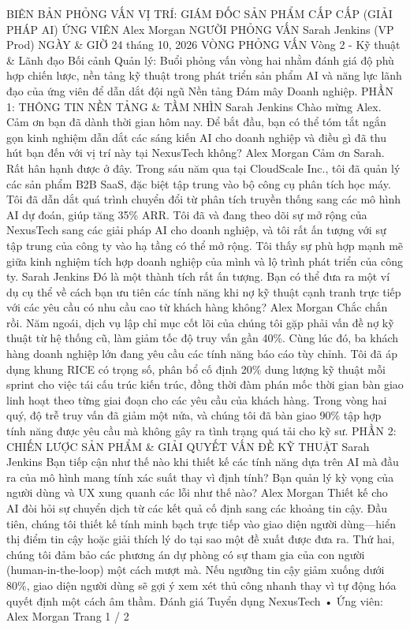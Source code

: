 \documentclass[12pt]{article}
\begin{document}
BIÊN BẢN PHỎNG VẤN
VỊ TRÍ: GIÁM ĐỐC SẢN PHẨM CẤP CẤP (GIẢI PHÁP AI)
ỨNG VIÊN
Alex Morgan
NGƯỜI PHỎNG VẤN
Sarah Jenkins (VP Prod)
NGÀY \& GIỜ
24 tháng 10, 2026
VÒNG PHỎNG VẤN
Vòng 2 - Kỹ thuật \&
Lãnh đạo
Bối cảnh Quản lý: Buổi phỏng vấn vòng hai nhằm đánh giá độ phù hợp chiến lược, nền tảng kỹ thuật trong phát triển sản phẩm AI và năng lực lãnh đạo của ứng viên để dẫn dắt đội ngũ Nền tảng Đám mây Doanh nghiệp.
PHẦN 1: THÔNG TIN NỀN TẢNG \& TẦM NHÌN
Sarah Jenkins
Chào mừng Alex. Cảm ơn bạn đã dành thời gian hôm nay. Để bắt đầu, bạn có thể tóm tắt ngắn gọn kinh nghiệm dẫn dắt các sáng kiến AI cho doanh nghiệp và điều gì đã thu hút bạn đến với vị trí này tại NexusTech không?
Alex Morgan
Cảm ơn Sarah. Rất hân hạnh được ở đây. Trong sáu năm qua tại CloudScale Inc., tôi đã quản lý các sản phẩm B2B SaaS, đặc biệt tập trung vào bộ công cụ phân tích học máy. Tôi đã dẫn dắt quá trình chuyển đổi từ phân tích truyền thống sang các mô hình AI dự đoán, giúp tăng 35\% ARR. Tôi đã và đang theo dõi sự mở rộng của NexusTech sang các giải pháp AI cho doanh nghiệp, và tôi rất ấn tượng với sự tập trung của công ty vào hạ tầng có thể mở rộng. Tôi thấy sự phù hợp mạnh mẽ giữa kinh nghiệm tích hợp doanh nghiệp của mình và lộ trình phát triển của công ty.
Sarah Jenkins
Đó là một thành tích rất ấn tượng. Bạn có thể đưa ra một ví dụ cụ thể về cách bạn ưu tiên các tính năng khi nợ kỹ thuật cạnh tranh trực tiếp với các yêu cầu có nhu cầu cao từ khách hàng không?
Alex Morgan
Chắc chắn rồi. Năm ngoái, dịch vụ lập chỉ mục cốt lõi của chúng tôi gặp phải vấn đề nợ kỹ thuật từ hệ thống cũ, làm giảm tốc độ truy vấn gần 40\%. Cùng lúc đó, ba khách hàng doanh nghiệp lớn đang yêu cầu các tính năng báo cáo tùy chỉnh. Tôi đã áp dụng khung RICE có trọng số, phân bổ cố định 20\% dung lượng kỹ thuật mỗi sprint cho việc tái cấu trúc kiến trúc, đồng thời đàm phán mốc thời gian bàn giao linh hoạt theo từng giai đoạn cho các yêu cầu của khách hàng. Trong vòng hai quý, độ trễ truy vấn đã giảm một nửa, và chúng tôi đã bàn giao 90\% tập hợp tính năng được yêu cầu mà không gây ra tình trạng quá tải cho kỹ sư.
PHẦN 2: CHIẾN LƯỢC SẢN PHẨM \& GIẢI QUYẾT VẤN ĐỀ KỸ THUẬT
Sarah Jenkins
Bạn tiếp cận như thế nào khi thiết kế các tính năng dựa trên AI mà đầu ra của mô hình mang tính xác suất thay vì định tính? Bạn quản lý kỳ vọng của người dùng và UX xung quanh các lỗi như thế nào?
Alex Morgan
Thiết kế cho AI đòi hỏi sự chuyển dịch từ các kết quả cố định sang các khoảng tin cậy. Đầu tiên, chúng tôi thiết kế tính minh bạch trực tiếp vào giao diện người dùng—hiển thị điểm tin cậy hoặc giải thích lý do tại sao một đề xuất được đưa ra. Thứ hai, chúng tôi đảm bảo các phương án dự phòng có sự tham gia của con người (human-in-the-loop) một cách mượt mà. Nếu ngưỡng tin cậy giảm xuống dưới 80\%, giao diện người dùng sẽ gợi ý xem xét thủ công nhanh thay vì tự động hóa quyết định một cách âm thầm.
Đánh giá Tuyển dụng NexusTech • Ứng viên: Alex Morgan
Trang 1 / 2
\end{document}
